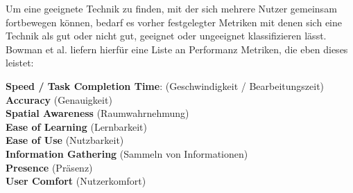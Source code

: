 Um eine geeignete Technik zu finden, mit der sich mehrere Nutzer gemeinsam fortbewegen können, bedarf es vorher festgelegter Metriken mit denen sich eine Technik als gut oder nicht gut, geeignet oder ungeeignet klassifizieren lässt.
Bowman et al. \cite{Bowman1998AEnvironments} liefern hierfür eine Liste an Performanz Metriken, die eben dieses leistet:

\begin{addmargin}[25pt]{0pt} 
\textbf{Speed / Task Completion Time}: (Geschwindigkeit / Bearbeitungszeit)\\
\textbf{Accuracy} (Genauigkeit) \\
\textbf{Spatial Awareness} (Raumwahrnehmung) \\
\textbf{Ease of Learning} (Lernbarkeit) \\
\textbf{Ease of Use} (Nutzbarkeit) \\
\textbf{Information Gathering} (Sammeln von Informationen) \\
\textbf{Presence} (Präsenz) \\
\textbf{User Comfort} (Nutzerkomfort) \\
\end{addmargin}
 
